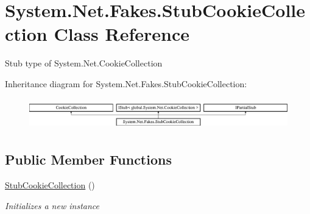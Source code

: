 \hypertarget{class_system_1_1_net_1_1_fakes_1_1_stub_cookie_collection}{\section{System.\-Net.\-Fakes.\-Stub\-Cookie\-Collection Class Reference}
\label{class_system_1_1_net_1_1_fakes_1_1_stub_cookie_collection}
}


Stub type of System.\-Net.\-Cookie\-Collection 


Inheritance diagram for System.\-Net.\-Fakes.\-Stub\-Cookie\-Collection\-:\begin{figure}[H]
\begin{center}
\leavevmode
\includegraphics[height=1.372549cm]{class_system_1_1_net_1_1_fakes_1_1_stub_cookie_collection}
\end{center}
\end{figure}
\subsection*{Public Member Functions}
\begin{DoxyCompactItemize}
\item 
\hyperlink{class_system_1_1_net_1_1_fakes_1_1_stub_cookie_collection_a9e2a1abc23adc40b55b4781a900a7b85}{Stub\-Cookie\-Collection} ()
\begin{DoxyCompactList}\small\item\em Initializes a new instance\end{DoxyCompactList}\end{DoxyCompactItemize}
